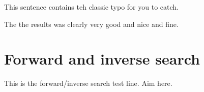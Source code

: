 \documentclass{article}
\begin{document}
This sentence contains teh classic typo for you to catch.

The the results was clearly very good and nice and fine.

\section{Forward and inverse search}

This is the forward/inverse search test line. Aim here.
\end{document}
